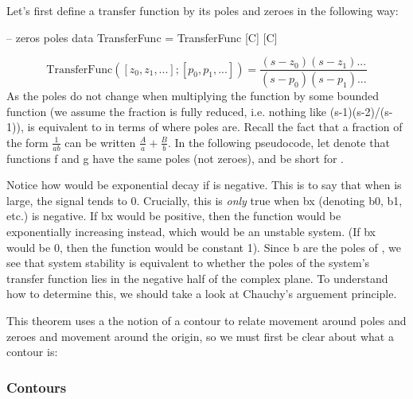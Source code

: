 Let's first define a transfer function by its poles and zeroes in the following way:
\begin{code}
--                             zeros poles
data TransferFunc = TransferFunc [C] [C]
\end{code}
\begin{equation*}
    \text{TransferFunc}([z_0,z_1,...]; [p_0,p_1,...])=\frac{(s-z_0)(s-z_1)...}{(s-p_0)(s-p_1)...}
\end{equation*}
\LNContinue
As the poles do not change when multiplying the function by some bounded function (we assume the fraction is fully reduced, i.e. nothing like (s-1)(s-2)/(s-1)),  is equivalent to  in terms of where poles are. Recall the fact that a fraction of the form $\frac{1}{ab}$ can be written $\frac{A}{a}+\frac{B}{b}$. %
In the following pseudocode, let  denote that functions f and g have the same poles (not zeroes), and  be short for .

Notice how  would be exponential decay if  is negative. This is to say that when  is large, the signal tends to 0. Crucially, this is \textit{only} true when bx (denoting b0, b1, etc.) is negative. If bx would be positive, then the function would be exponentially increasing instead, which would be an unstable system. (If bx would be 0, then the function would be constant 1). Since b are the poles of , we see that system stability is equivalent to whether the poles of the system's transfer function lies in the negative half of the complex plane. To understand how to determine this, we should take a look at Chauchy's arguement principle.



This theorem uses a the notion of a contour to relate movement around poles and zeroes and movement around the origin, so we must first be clear about what a contour is: 

\subsubsection{Contours}

